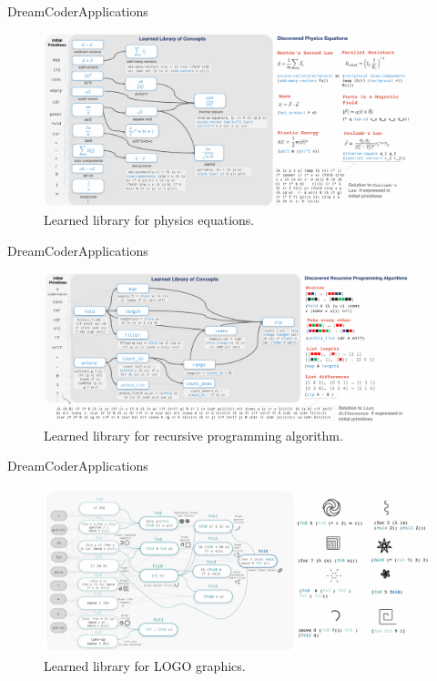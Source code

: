 \documentclass[AERbeamer%
              ,optEnglish%
              ,optBiber%
              ,optBibstyleAlphabetic%
              ,optBeamerClassicFormat%
              ]{AERlatex}%
\begin{document}
\begin{frame}[c]{DreamCoder}{Applications}
    \centering
    \begin{figure}
        \centering
        \includegraphics[width=0.95\textwidth]{DreamCoderApplication1.png}
        \caption{Learned library for physics equations.}
    \end{figure}
\end{frame}


\begin{frame}[c]{DreamCoder}{Applications}
    \centering
    \begin{figure}
        \centering
        \includegraphics[width=0.95\textwidth]{DreamCoderApplication2.png}
        \caption{Learned library for recursive programming algorithm.}
    \end{figure}
\end{frame}


\begin{frame}[c]{DreamCoder}{Applications}
    \centering
    \begin{figure}
        \centering
        \includegraphics[width=\textwidth]{DreamCoderApplication3.png}
        \caption{Learned library for LOGO graphics.}
    \end{figure}
\end{frame}
\end{document}

